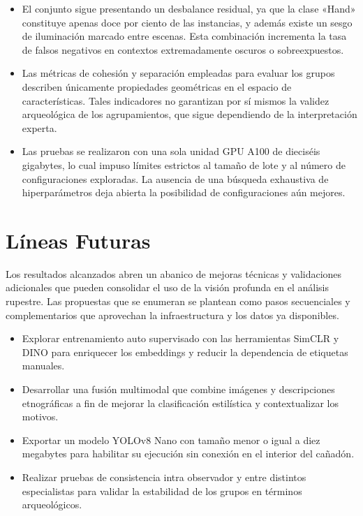 \begin{itemize}
  \item El conjunto sigue presentando un desbalance residual, ya que la clase «Hand» constituye apenas doce por ciento de las instancias, y además existe un sesgo de iluminación marcado entre escenas.
        Esta combinación incrementa la tasa de falsos negativos en contextos extremadamente oscuros o sobreexpuestos.

  \item Las métricas de cohesión y separación empleadas para evaluar los grupos describen únicamente propiedades geométricas en el espacio de características.
        Tales indicadores no garantizan por sí mismos la validez arqueológica de los agrupamientos, que sigue dependiendo de la interpretación experta.

  \item Las pruebas se realizaron con una sola unidad GPU A100 de dieciséis gigabytes, lo cual impuso límites estrictos al tamaño de lote y al número de configuraciones exploradas.
        La ausencia de una búsqueda exhaustiva de hiperparámetros deja abierta la posibilidad de configuraciones aún mejores.
\end{itemize}

\section{Líneas Futuras}

Los resultados alcanzados abren un abanico de mejoras técnicas y validaciones adicionales que pueden consolidar el uso de la visión profunda en el análisis rupestre.
Las propuestas que se enumeran se plantean como pasos secuenciales y complementarios que aprovechan la infraestructura y los datos ya disponibles.

\begin{itemize}
  \item Explorar entrenamiento auto supervisado con las herramientas SimCLR y DINO para enriquecer los embeddings y reducir la dependencia de etiquetas manuales.
  \item Desarrollar una fusión multimodal que combine imágenes y descripciones etnográficas a fin de mejorar la clasificación estilística y contextualizar los motivos.
  \item Exportar un modelo YOLOv8 Nano con tamaño menor o igual a diez megabytes para habilitar su ejecución sin conexión en el interior del cañadón.
  \item Realizar pruebas de consistencia intra observador y entre distintos especialistas para validar la estabilidad de los grupos en términos arqueológicos.
\end{itemize}

